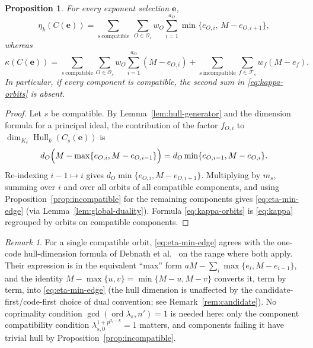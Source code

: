 \documentclass[11pt,a4paper]{article}
\newcommand{\Fs}{\mathcal F_s}
\newcommand{\Os}{\mathcal O_s}
\newcommand{\Hull}{\operatorname{Hull}}
\numberwithin{equation}{section}
\theoremstyle{plain}
\newtheorem{proposition}[theorem]{Proposition}
\theoremstyle{definition}
\theoremstyle{remark}
\newtheorem{remark}[theorem]{Remark}
\begin{document}
\begin{proposition}\label{prop:min-edge}
For every exponent selection $\mathbf{e}$,
\begin{equation}\label{eq:eta-min-edge}
\eta_k(C(\mathbf{e}))
 =\sum_{s\ \mathrm{compatible}}\ \sum_{O\in\Os}
   w_O\sum_{i=1}^{a_O}\min\{e_{O,i},\,M-e_{O,i+1}\},
\end{equation}
whereas
\begin{equation}\label{eq:kappa-orbits}
\kappa(C(\mathbf{e}))
 =\sum_{s\ \mathrm{compatible}}\sum_{O\in\Os}
   w_O\sum_{i=1}^{a_O}(M-e_{O,i})
  +\sum_{s\ \mathrm{incompatible}}\sum_{f\in\Fs}w_f(M-e_f).
\end{equation}
In particular, if every component is compatible, the second sum in
\eqref{eq:kappa-orbits} is absent.
\end{proposition}

\begin{proof}
Let $s$ be compatible.  By Lemma~\ref{lem:hull-generator} and the dimension
formula for a principal ideal, the contribution of the factor $f_{O,i}$ to
$\dim_{K_s}\Hull_k(C_s(\mathbf{e}))$ is
\[
d_O\Bigl(M-\max\{e_{O,i},M-e_{O,i-1}\}\Bigr)
   =d_O\min\{e_{O,i-1},M-e_{O,i}\}.
\]
Re-indexing $i-1\mapsto i$ gives $d_O\min\{e_{O,i},M-e_{O,i+1}\}$.
Multiplying by $m_s$, summing over $i$ and over all orbits of all compatible
components, and using Proposition~\ref{prop:incompatible} for the remaining
components gives \eqref{eq:eta-min-edge} (via
Lemma~\ref{lem:global-duality}).  Formula \eqref{eq:kappa-orbits} is
\eqref{eq:kappa} regrouped by orbits on compatible components.
\end{proof}

\begin{remark}\label{rem:debnath-agreement}
For a single compatible orbit, \eqref{eq:eta-min-edge} agrees with the
one-code hull-dimension formula of Debnath et al.\
\cite{debnathAffine2026} on the range where both apply. Their expression is
in the equivalent ``max'' form
$aM-\sum_i\max\{e_i,M-e_{i-1}\}$, and the identity
$M-\max\{u,v\}=\min\{M-u,M-v\}$ converts it, term by term, into
\eqref{eq:eta-min-edge} (the hull dimension is unaffected by the
candidate-first/code-first choice of dual convention; see
Remark~\ref{rem:candidate}). No coprimality condition
$\gcd(\operatorname{ord}\lambda_s,n')=1$ is needed here: only the component
compatibility condition $\lambda_{s,0}^{1+p^{d_s-k}}=1$ matters, and
components failing it have trivial hull by
Proposition~\ref{prop:incompatible}.
\end{remark}
\end{document}
